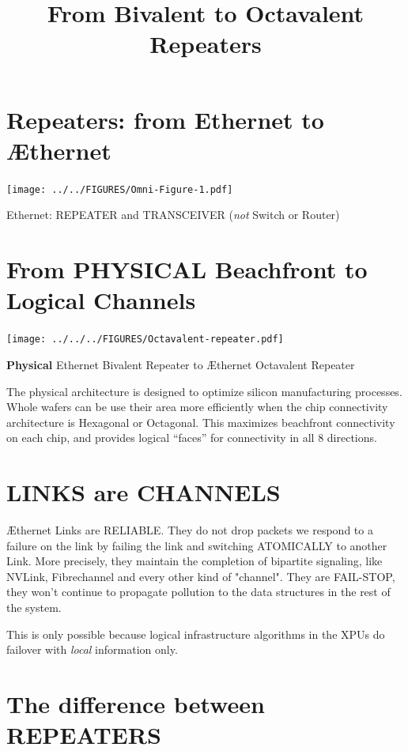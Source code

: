 \documentclass[../HFT-main.tex]{subfiles} %
\title{From Bivalent to Octavalent Repeaters}
\begin{document}
\section{Repeaters: from Ethernet to Æthernet}

\begin{marginfigure}
  \texttt{[image: ../../FIGURES/Omni-Figure-1.pdf]}
  \caption{Ethernet: REPEATER and TRANSCEIVER (\emph{not} Switch or Router)}
    \vspace{10pt}
\end{marginfigure}

\section{From PHYSICAL Beachfront to Logical Channels}
\begin{marginfigure}
  \texttt{[image: ../../../FIGURES/Octavalent-repeater.pdf]} %
  \caption{\textbf{Physical} Ethernet Bivalent Repeater to Æthernet Octavalent Repeater}
  \vspace{10pt}
\end{marginfigure}

The physical architecture is designed to optimize silicon manufacturing processes. Whole wafers can be use their area more efficiently when the chip connectivity architecture is Hexagonal or Octagonal. This maximizes beachfront connectivity on each chip, and provides logical ``faces'' for connectivity in all 8 directions.

\section{LINKS are CHANNELS}

Æthernet Links are RELIABLE. They do not drop packets we respond to a failure on the link by failing the link and switching ATOMICALLY  to another Link.  More precisely, they maintain the completion of bipartite signaling, like NVLink, Fibrechannel and every other kind of "channel". They are FAIL-STOP, they won't continue to propagate pollution to the data structures in the rest of the system.

This is only possible because logical infrastructure algorithms in the XPUs do failover with \emph{local} information only.


\section{The difference between REPEATERS}
\end{document}
